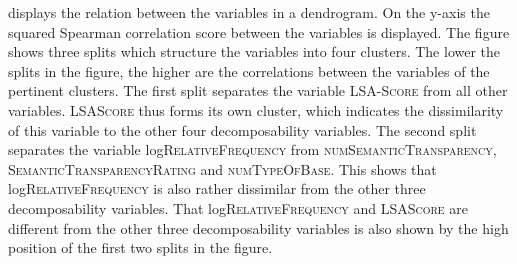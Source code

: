  
 \begin{table}

	\caption{Correlation matrix for decomposability measures in corpus study}
	\label{tab: Correlation matrix for all decomposability measures in corpus study}
	

 \end{table}
 
   displays the relation between the variables in a dendrogram. On the y-axis the squared Spearman correlation score between the variables is displayed. 
  The figure shows three splits which structure the variables into four clusters. The lower the splits in the figure, the higher are the correlations between the variables of the pertinent clusters.
      The first split separates the  variable \textsc{LSA-Score} from all other variables. \textsc{LSAScore} thus forms its own cluster, which indicates the dissimilarity of this variable to the other four decomposability variables. The second split separates the variable log\textsc{RelativeFrequency} from \textsc{numSemanticTransparency}, \textsc{SemanticTransparencyRating} and \textsc{numTypeOfBase}. This shows that log\textsc{RelativeFrequency} is also rather dissimilar from the other three decomposability variables. 
      That log\textsc{RelativeFrequency} and \textsc{LSAScore} are different from the other three decomposability variables is also shown by the high position of the first two splits in the figure.
      

